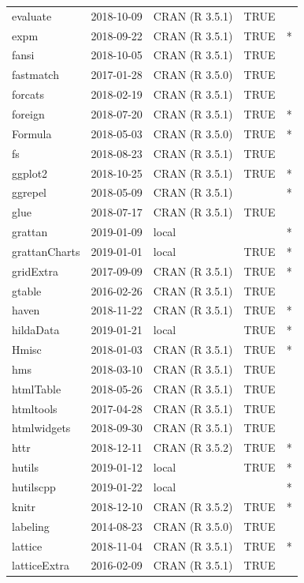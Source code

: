 \documentclass{grattan}\usepackage[]{graphicx}\usepackage[]{color}
\begin{document}
\begin{longtable}{lllll}
  evaluate & 2018-10-09 & CRAN (R 3.5.1) & TRUE &  \\ 
  expm & 2018-09-22 & CRAN (R 3.5.1) & TRUE & * \\ 
  fansi & 2018-10-05 & CRAN (R 3.5.1) & TRUE &  \\ 
  fastmatch & 2017-01-28 & CRAN (R 3.5.0) & TRUE &  \\ 
  forcats & 2018-02-19 & CRAN (R 3.5.1) & TRUE &  \\ 
  foreign & 2018-07-20 & CRAN (R 3.5.1) & TRUE & * \\ 
  Formula & 2018-05-03 & CRAN (R 3.5.0) & TRUE & * \\ 
  fs & 2018-08-23 & CRAN (R 3.5.1) & TRUE &  \\ 
  ggplot2 & 2018-10-25 & CRAN (R 3.5.1) & TRUE & * \\ 
  ggrepel & 2018-05-09 & CRAN (R 3.5.1) &  & * \\ 
  glue & 2018-07-17 & CRAN (R 3.5.1) & TRUE &  \\ 
  grattan & 2019-01-09 & local &  & * \\ 
  grattanCharts & 2019-01-01 & local & TRUE & * \\ 
  gridExtra & 2017-09-09 & CRAN (R 3.5.1) & TRUE & * \\ 
  gtable & 2016-02-26 & CRAN (R 3.5.1) & TRUE &  \\ 
  haven & 2018-11-22 & CRAN (R 3.5.1) & TRUE & * \\ 
  hildaData & 2019-01-21 & local & TRUE & * \\ 
  Hmisc & 2018-01-03 & CRAN (R 3.5.1) & TRUE & * \\ 
  hms & 2018-03-10 & CRAN (R 3.5.1) & TRUE &  \\ 
  htmlTable & 2018-05-26 & CRAN (R 3.5.1) & TRUE &  \\ 
  htmltools & 2017-04-28 & CRAN (R 3.5.1) & TRUE &  \\ 
  htmlwidgets & 2018-09-30 & CRAN (R 3.5.1) & TRUE &  \\ 
  httr & 2018-12-11 & CRAN (R 3.5.2) & TRUE & * \\ 
  hutils & 2019-01-12 & local & TRUE & * \\ 
  hutilscpp & 2019-01-22 & local &  & * \\ 
  knitr & 2018-12-10 & CRAN (R 3.5.2) & TRUE & * \\ 
  labeling & 2014-08-23 & CRAN (R 3.5.0) & TRUE &  \\ 
  lattice & 2018-11-04 & CRAN (R 3.5.1) & TRUE & * \\ 
  latticeExtra & 2016-02-09 & CRAN (R 3.5.1) & TRUE &  \\ 

\end{longtable}
\end{document}
